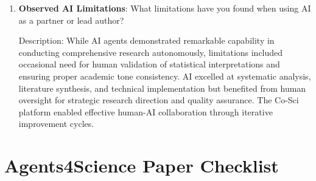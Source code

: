 \documentclass{article}
\begin{document}
\begin{enumerate}
    Answer: \involvementC{} %
    
    Explanation: The entire paper draft, including LaTeX formatting, comprehensive literature review, methodology section, results presentation, and discussion, was AI-generated by agents on the Co-Sci platform. Human researchers provided iteration requests and final oversight, but the paper synthesis and academic writing were performed autonomously by AI.

    \item \textbf{Observed AI Limitations}: What limitations have you found when using AI as a partner or lead author?

    Description: While AI agents demonstrated remarkable capability in conducting comprehensive research autonomously, limitations included occasional need for human validation of statistical interpretations and ensuring proper academic tone consistency. AI excelled at systematic analysis, literature synthesis, and technical implementation but benefited from human oversight for strategic research direction and quality assurance. The Co-Sci platform enabled effective human-AI collaboration through iterative improvement cycles.
\end{enumerate}

\newpage

\section*{Agents4Science Paper Checklist}
\end{document}
